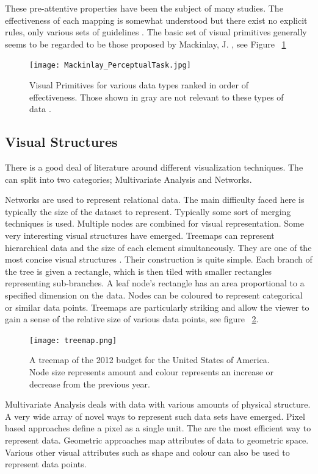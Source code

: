 \documentclass[a4paper, 10pt, titlepage, twocolumn, onehalfspace]{article}
\begin{document}
These pre-attentive properties have been the subject of many studies. The effectiveness of each mapping is somewhat understood but there exist no explicit rules, only various sets of guidelines \cite{few2004show}. The basic set of visual primitives generally seems to be regarded to be those proposed by Mackinlay, J. \cite{mackinlay1986automating}, see Figure ~\ref{fig:jock} 
\begin{figure}[hbt]
  \begin{center}
    \texttt{[image: Mackinlay\_PerceptualTask.jpg]}
  \end{center}
  \caption{\small Visual Primitives for various data types ranked in order of effectiveness. Those shown in gray are not relevant to these types of data \cite{mackinlay1986automating}.}
  \label{fig:jock}
\end{figure}
\subsection{Visual Structures}
There is a good deal of literature around different visualization techniques. The can split into two categories; Multivariate Analysis and Networks.

Networks are used to represent relational data. The main difficulty faced here is typically the size of the dataset to represent. Typically some sort of merging techniques is used. Multiple nodes are combined for visual representation. Some very interesting visual structures have emerged. Treemaps can represent hierarchical data and the size of each element simultaneously. They are one of the most concise visual structures \cite{shneiderman2001ordered}. Their construction is quite simple. Each branch of the tree is given a rectangle, which is then tiled with smaller rectangles representing sub-branches. A leaf node's rectangle has an area proportional to a specified dimension on the data. Nodes can be coloured to represent categorical or similar data points. Treemaps are particularly striking and allow the viewer to gain a sense of the relative size of various data points, see figure ~\ref{fig:treemap}. 


\begin{figure}[hbt]
  \begin{center}
    \texttt{[image: treemap.png]}
  \end{center}
  \caption{\small A treemap of the 2012 budget for the United States of America. Node size represents amount and colour represents an increase or decrease from the previous year.}
  \label{fig:treemap}
\end{figure}
Multivariate Analysis deals with data with various amounts of physical structure. A very wide array of novel ways to represent such data sets have emerged. Pixel based approaches define a pixel as a single unit. The are the most efficient way to represent data. Geometric approaches map attributes of data to geometric space. Various other visual attributes such as shape and colour can also be used to represent data points.
\end{document}

